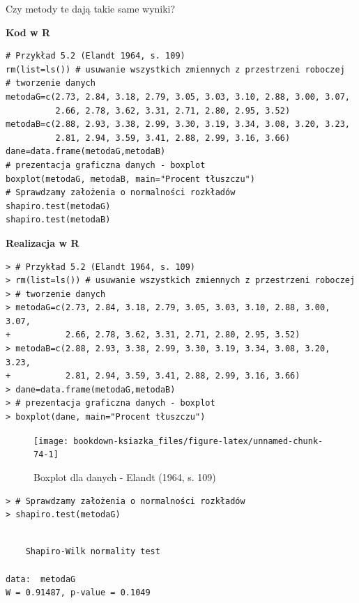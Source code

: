 \documentclass[12pt,B5paper,]{book}
\begin{document}
Czy metody te dają takie same wyniki?

\textbf{Kod w R}

\begin{verbatim}
# Przykład 5.2 (Elandt 1964, s. 109)
rm(list=ls()) # usuwanie wszystkich zmiennych z przestrzeni roboczej
# tworzenie danych
metodaG=c(2.73, 2.84, 3.18, 2.79, 3.05, 3.03, 3.10, 2.88, 3.00, 3.07,
          2.66, 2.78, 3.62, 3.31, 2.71, 2.80, 2.95, 3.52)
metodaB=c(2.88, 2.93, 3.38, 2.99, 3.30, 3.19, 3.34, 3.08, 3.20, 3.23,
          2.81, 2.94, 3.59, 3.41, 2.88, 2.99, 3.16, 3.66)
dane=data.frame(metodaG,metodaB)
# prezentacja graficzna danych - boxplot
boxplot(metodaG, metodaB, main="Procent tłuszczu")
# Sprawdzamy założenia o normalności rozkładów
shapiro.test(metodaG)
shapiro.test(metodaB)
\end{verbatim}

\vspace{0.8cm} \textbf{Realizacja w R}

\begin{verbatim}
> # Przykład 5.2 (Elandt 1964, s. 109)
> rm(list=ls()) # usuwanie wszystkich zmiennych z przestrzeni roboczej
> # tworzenie danych
> metodaG=c(2.73, 2.84, 3.18, 2.79, 3.05, 3.03, 3.10, 2.88, 3.00, 3.07,
+           2.66, 2.78, 3.62, 3.31, 2.71, 2.80, 2.95, 3.52)
> metodaB=c(2.88, 2.93, 3.38, 2.99, 3.30, 3.19, 3.34, 3.08, 3.20, 3.23,
+           2.81, 2.94, 3.59, 3.41, 2.88, 2.99, 3.16, 3.66)
> dane=data.frame(metodaG,metodaB)
> # prezentacja graficzna danych - boxplot
> boxplot(dane, main="Procent tłuszczu")
\end{verbatim}

\begin{figure}[H]

{\centering \texttt{[image: bookdown-ksiazka\_files/figure-latex/unnamed-chunk-74-1]} 

}

\caption{Boxplot dla danych - Elandt (1964, s. 109)}\label{fig:unnamed-chunk-74}
\end{figure}

\begin{verbatim}
> # Sprawdzamy założenia o normalności rozkładów
> shapiro.test(metodaG)
\end{verbatim}

\begin{verbatim}

    Shapiro-Wilk normality test

data:  metodaG
W = 0.91487, p-value = 0.1049
\end{verbatim}
\end{document}
